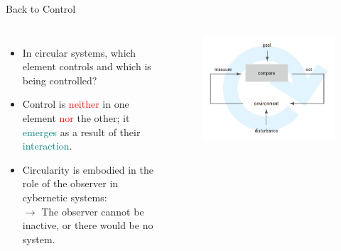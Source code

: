 \documentclass[
	11pt,
	aspectratio=169,
]{beamer}
\begin{document}
            \begin{frame}{Back to Control}
                \begin{columns}
                        \begin{itemize}
                            \item<1-> In circular systems, which element controls and which is being controlled?
                            \item<2-> Control is \textcolor{red}{neither} in one element \textcolor{red}{nor} the other; it \textcolor{teal}{emerges} as a result of their \textcolor{teal}{interaction}.
                            \item<3-> Circularity is embodied in the role of the observer in cybernetic systems:\\
                            $\longrightarrow$ The observer cannot be inactive, or there would be no system.
                        \end{itemize}
                    \begin{figure}
        		        \centering\includegraphics[height=0.6\textheight]{resources/thermostate.PNG}
        		    \end{figure}
                \end{columns}
            \end{frame}
\end{document}
